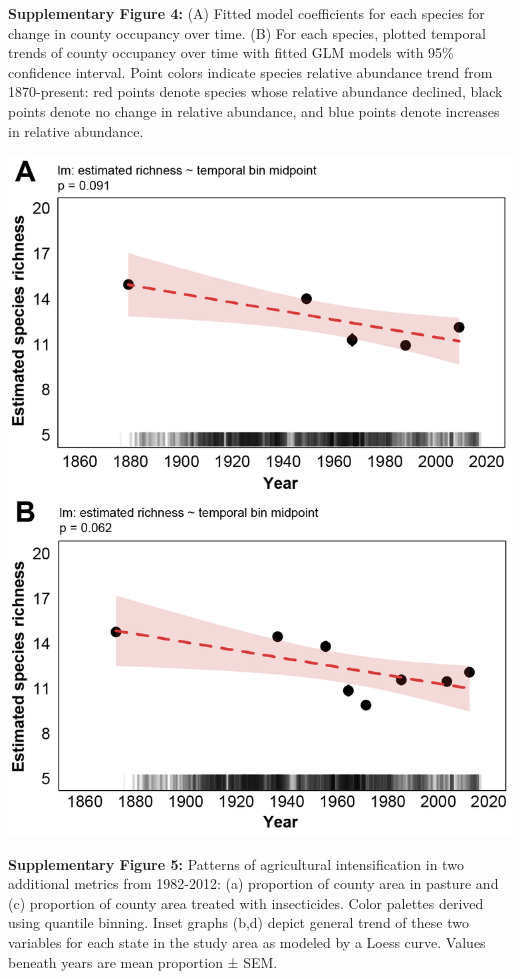 \documentclass[11pt,]{article}
\begin{document}
\textbf{Supplementary Figure 4:} (A) Fitted model coefficients for each
species for change in county occupancy over time. (B) For each species,
plotted temporal trends of county occupancy over time with fitted GLM
models with 95\% confidence interval. Point colors indicate species
relative abundance trend from 1870-present: red points denote species
whose relative abundance declined, black points denote no change in
relative abundance, and blue points denote increases in relative
abundance.

\clearpage

\newpage

\includegraphics[width=1\textwidth,height=\textheight]{../ms_figs/fig_s4.png}

\textbf{Supplementary Figure 5:} Patterns of agricultural
intensification in two additional metrics from 1982-2012: (a) proportion
of county area in pasture and (c) proportion of county area treated with
insecticides. Color palettes derived using quantile binning. Inset
graphs (b,d) depict general trend of these two variables for each state
in the study area as modeled by a Loess curve. Values beneath years are
mean proportion ± SEM.
\end{document}
